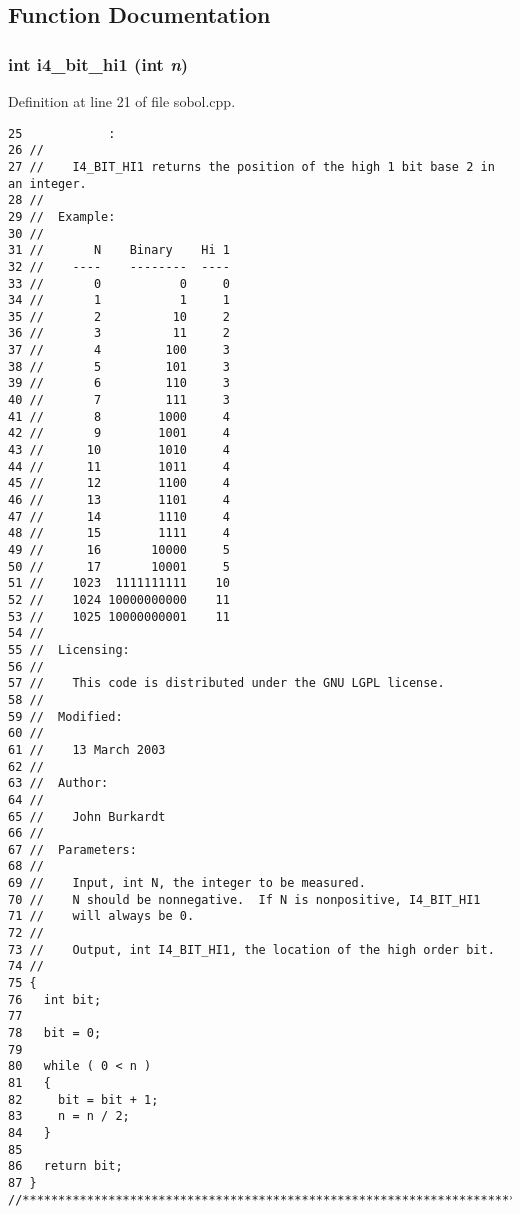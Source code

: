 \subsection{Function Documentation}
\subsubsection{\setlength{\rightskip}{0pt plus 5cm}int i4\_\-bit\_\-hi1 (int {\em n})}\label{test_2sobol_8H_6fb065d7955723a90f53c5d4cc0f160d}




Definition at line 21 of file sobol.cpp.

\begin{Code}\begin{verbatim}25            :
26 //
27 //    I4_BIT_HI1 returns the position of the high 1 bit base 2 in an integer.
28 //
29 //  Example:
30 //
31 //       N    Binary    Hi 1
32 //    ----    --------  ----
33 //       0           0     0
34 //       1           1     1
35 //       2          10     2
36 //       3          11     2 
37 //       4         100     3
38 //       5         101     3
39 //       6         110     3
40 //       7         111     3
41 //       8        1000     4
42 //       9        1001     4
43 //      10        1010     4
44 //      11        1011     4
45 //      12        1100     4
46 //      13        1101     4
47 //      14        1110     4
48 //      15        1111     4
49 //      16       10000     5
50 //      17       10001     5
51 //    1023  1111111111    10
52 //    1024 10000000000    11
53 //    1025 10000000001    11
54 //
55 //  Licensing:
56 //
57 //    This code is distributed under the GNU LGPL license. 
58 //
59 //  Modified:
60 //
61 //    13 March 2003
62 //
63 //  Author:
64 //
65 //    John Burkardt
66 //
67 //  Parameters:
68 //
69 //    Input, int N, the integer to be measured.
70 //    N should be nonnegative.  If N is nonpositive, I4_BIT_HI1
71 //    will always be 0.
72 //
73 //    Output, int I4_BIT_HI1, the location of the high order bit.
74 //
75 {
76   int bit;
77 
78   bit = 0;
79 
80   while ( 0 < n )
81   {
82     bit = bit + 1;
83     n = n / 2;
84   }
85 
86   return bit;
87 }
//****************************************************************************80
\end{verbatim}
\end{Code}


